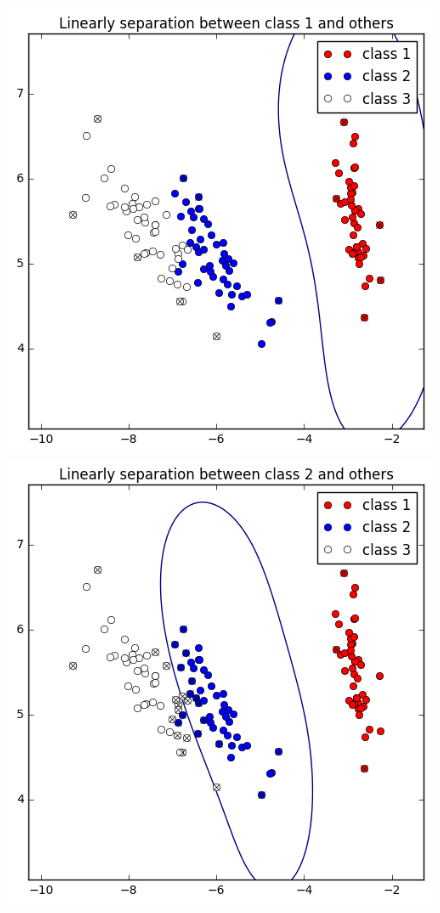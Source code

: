 \documentclass[a4paper,11pt]{article}
\begin{document}
\begin{figure}[htbp]
  \includegraphics[scale=0.3]{nl1_23.png}
  \includegraphics[scale=0.3]{nl2_13.png}

\end{figure}
\end{document}
